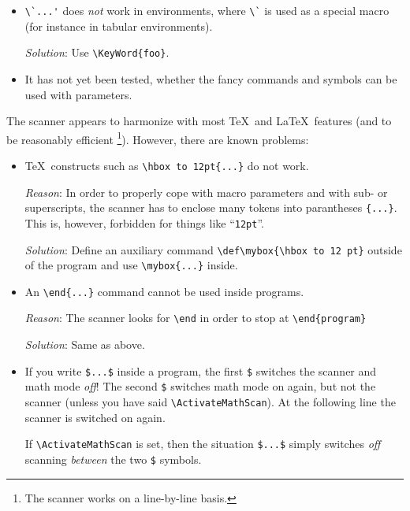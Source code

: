 \begin{itemize}
    A better way is to do the change of category only locally within a
    group. However, this would make the new command \verb=^|^= also only
    locally known. Hence, the solution is slightly more complex:
\begin{verbatim}
{ \catcode`\^=12
  \global\def\MyNewSymbol{\SetSymbol{^|^}{...}}
}\MyNewSymbol
\end{verbatim}
    
  \item \verb+\`...'+ does \emph{not} work in environments, where \verb+\`+
    is used as a special macro (for instance in tabular environments). 

    \emph{Solution}: Use \verb+\KeyWord{foo}+.


  \item It has not yet been tested, whether the fancy commands and symbols
    can be used with parameters.


\end{itemize}

The scanner appears to harmonize with most \TeX~and \LaTeX~features (and to
be reasonably efficient%
\footnote{ The scanner works on a line-by-line basis.}). However,
there are known problems:

\begin{itemize}
\item \TeX~constructs such as \verb=\hbox to 12pt{...}= do not work. 
  
  \emph{Reason}: In order to properly cope with macro parameters and with
  sub- or superscripts, the scanner has to enclose many tokens into
  parantheses \verb={...}=. This is, however, forbidden for things like
  ``\texttt{12pt}''.

  \emph{Solution}: Define an auxiliary command 
  \verb=\def\mybox{\hbox to 12 pt}= outside of the program and use 
  \verb=\mybox{...}= inside.

\item An \verb=\end{...}= command cannot be used inside programs.

  \emph{Reason}: The scanner looks for \verb=\end= in order to stop at
  \verb=\end{program}=

  \emph{Solution}: Same as above.

\item If you write \verb=$...$= inside a program, the first \verb=$=
  switches the scanner and math mode \emph{off}! The second \verb=$=
  switches math mode on again, but not the scanner (unless you have said
  \verb=\ActivateMathScan=). At the following line the scanner is switched
  on again.

  If \verb=\ActivateMathScan= is set, then the situation
  \verb=$...$= simply switches \emph{off} scanning \emph{between} the
  two \verb=$= symbols.


\end{itemize}







